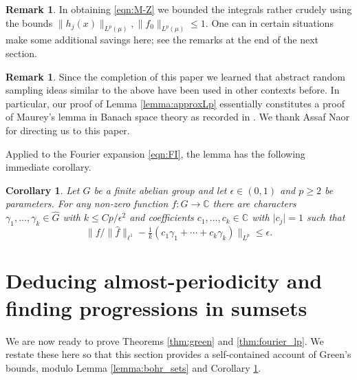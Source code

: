 \documentclass[12pt,a4paper,reqno]{amsart}
\numberwithin{equation}{section}
\theoremstyle{plain}
\newtheorem{corollary}[subsection]{Corollary}
\theoremstyle{definition}
\newtheorem{remark}[subsection]{Remark}
\renewcommand{\leq}{\leqslant}
\renewcommand{\geq}{\geqslant}
\def\C{\mathbb{C}}
\def\Ghat{\widehat{G}}
\def\fhat{\widehat{f}}
\providecommand{\abs}[1]{\lvert#1\rvert}
\providecommand{\norm}[1]{\lVert #1 \rVert}
\theoremstyle{plain}
\begin{document}
\begin{remark}
In obtaining \eqref{eqn:M-Z} we bounded the integrals rather crudely using the bounds $\norm{h_j(x)}_{L^p(\mu)}, \norm{f_0}_{L^p(\mu)} \leq 1$. One can in certain situations make some additional savings here; see the remarks at the end of the next section.
\end{remark}

\begin{remark}
Since the completion of this paper we learned that abstract random sampling ideas similar to the above have been used in other contexts before. In particular, our proof of Lemma \ref{lemma:approxLp} essentially constitutes a proof of Maurey's lemma in Banach space theory as recorded in \cite{pisier:Maurey}. We thank Assaf Naor for directing us to this paper.
\end{remark}

Applied to the Fourier expansion \eqref{eqn:FI}, the lemma has the following immediate corollary.

\begin{corollary}\label{cor:FourierSampling}
Let $G$ be a finite abelian group and let $\epsilon \in (0,1)$ and $p \geq 2$ be parameters. For any non-zero function $f : G \to \C$ there are characters $\gamma_1, \ldots, \gamma_k \in \Ghat$ with $k \leq Cp/\epsilon^2$ and coefficients $c_1, \ldots, c_k \in \C$ with $\abs{c_j} = 1$ such that
\[ \norm{ f/\norm{\fhat}_{\ell^1} - \tfrac{1}{k}(c_1 \gamma_1 + \cdots + c_k \gamma_k) }_{L^p} \leq \epsilon. \]
\end{corollary}


\section{Deducing almost-periodicity and finding progressions in sumsets}\label{section:simple_periodicity}
We are now ready to prove Theorems \ref{thm:green} and \ref{thm:fourier_lp}. We restate these here so that this section provides a self-contained account of Green's bounds, modulo Lemma \ref{lemma:bohr_sets} and Corollary \ref{cor:FourierSampling}.
\end{document}
